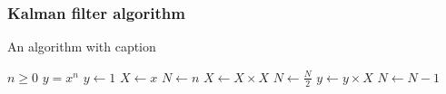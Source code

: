         \subsubsection{Kalman filter algorithm}

\begin{algorithm}
    \caption{An algorithm with caption}\label{alg:cap}
    \begin{algorithmic}
        \Require $n \geq 0$
        \Ensure $y = x^n$
        \State $y \gets 1$
        \State $X \gets x$
        \State $N \gets n$
                \State $X \gets X \times X$
                \State $N \gets \frac{N}{2}$  
            \State $y \gets y \times X$
            \State $N \gets N - 1$
            \EndIf
        \EndWhile
    \end{algorithmic}
\end{algorithm}